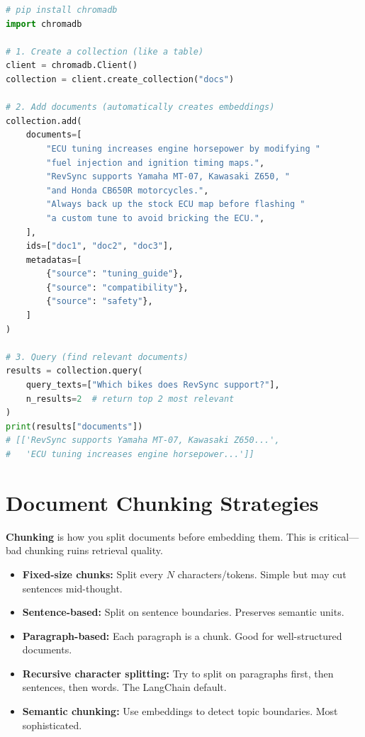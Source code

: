 \documentclass[12pt, a4paper, oneside]{book}
\begin{document}
\begin{lstlisting}[language=Python, caption={RAG with ChromaDB}]
# pip install chromadb
import chromadb

# 1. Create a collection (like a table)
client = chromadb.Client()
collection = client.create_collection("docs")

# 2. Add documents (automatically creates embeddings)
collection.add(
    documents=[
        "ECU tuning increases engine horsepower by modifying "
        "fuel injection and ignition timing maps.",
        "RevSync supports Yamaha MT-07, Kawasaki Z650, "
        "and Honda CB650R motorcycles.",
        "Always back up the stock ECU map before flashing "
        "a custom tune to avoid bricking the ECU.",
    ],
    ids=["doc1", "doc2", "doc3"],
    metadatas=[
        {"source": "tuning_guide"},
        {"source": "compatibility"},
        {"source": "safety"},
    ]
)

# 3. Query (find relevant documents)
results = collection.query(
    query_texts=["Which bikes does RevSync support?"],
    n_results=2  # return top 2 most relevant
)
print(results["documents"])
# [['RevSync supports Yamaha MT-07, Kawasaki Z650...',
#   'ECU tuning increases engine horsepower...']]
\end{lstlisting}

\section{Document Chunking Strategies}

\textbf{Chunking} is how you split documents before embedding them. This is critical---bad chunking ruins retrieval quality.

\begin{itemize}[leftmargin=2em]
    \item \textbf{Fixed-size chunks:} Split every $N$ characters/tokens. Simple but may cut sentences mid-thought.
    \item \textbf{Sentence-based:} Split on sentence boundaries. Preserves semantic units.
    \item \textbf{Paragraph-based:} Each paragraph is a chunk. Good for well-structured documents.
    \item \textbf{Recursive character splitting:} Try to split on paragraphs first, then sentences, then words. The LangChain default.
    \item \textbf{Semantic chunking:} Use embeddings to detect topic boundaries. Most sophisticated.
\end{itemize}
\end{document}
